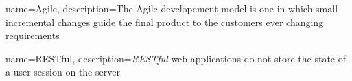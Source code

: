 {
  name={Agile},
  description={The Agile developement model is one in which small incremental changes guide the final product to the customers ever changing requirements}
}

{
  name={RESTful},
  description={\emph{RESTful} web applications do not store the state of a user session on the server}
}

